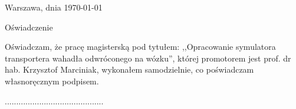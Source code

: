 \documentclass[12pt, twoside, openany]{report}
\theoremstyle{definition}
\begin{document}
\clearpage
\pagestyle{empty}
\noindent Warszawa, dnia \today
\vspace{5cm}
\begin{center}
	\LARGE{Oświadczenie}
\end{center}
Oświadczam, że pracę magisterską pod tytułem: ,,Opracowanie symulatora transportera wahadła odwróconego na wózku'', której promotorem jest prof. dr hab. Krzysztof Marciniak, wykonałem samodzielnie, co poświadczam własnoręcznym podpisem.
\vspace{2cm}
\begin{flushright}
...........................................
\end{flushright}
\end{document}
